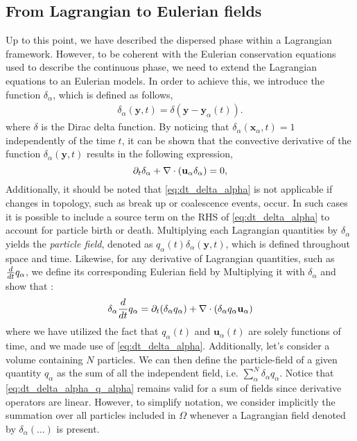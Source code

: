\subsection{From Lagrangian to Eulerian fields}
Up to this point, we have described the dispersed phase within a Lagrangian framework.
However, to be coherent with the Eulerian conservation equations used to describe the continuous phase, we need to extend the Lagrangian equations to an Eulerian models. 
In order to achieve this, we introduce the function $\delta_\alpha$, which is defined as follows, 
\begin{align}
    \delta_\alpha(\textbf{y},t) = \delta(\textbf{y}-\textbf{y}_\alpha(t)).
    \label{eq:delta_alpha}
\end{align}
where $\delta$ is the Dirac delta function.
By noticing that $\delta_\alpha(\textbf{x}_\alpha,t) = 1$ independently of the time $t$, it can be shown that the convective derivative of the function $\delta_\alpha(\textbf{y},t)$ results in the following expression, 
\begin{equation}
    \partial_t \delta_\alpha
    + \mathbf{\nabla} \cdot (\textbf{u}_\alpha  \delta_\alpha)
    =0,
    \label{eq:dt_delta_alpha}
\end{equation}
Additionally, it should be noted that \ref{eq:dt_delta_alpha} is not applicable if changes in topology, such as break up or coalescence events, occur.
In such cases it is possible to include a source term on the RHS of \ref{eq:dt_delta_alpha} to account for particle birth or death. 
Multiplying each Lagrangian quantities by $\delta_\alpha$ yields the \textit{particle field}, denoted as $q_\alpha(t)\delta_\alpha(\textbf{y},t)$, which is defined throughout space and time.
Likewise, for any derivative of Lagrangian quantities, such as $\frac{d}{d t} q_\alpha$, we define its corresponding Eulerian field by Multiplying it with $\delta_\alpha$ and show that :
\begin{equation}
    \delta_\alpha \frac{d}{d t} q_\alpha
    = \partial_t (\delta_\alpha q_\alpha)
    + \mathbf{\nabla} \cdot (\delta_\alpha q_\alpha \textbf{u}_\alpha)
    \label{eq:dt_delta_alpha_q_alpha}
\end{equation}
where we have utilized the fact that $q_\alpha(t)$ and $\textbf{u}_\alpha(t)$ are solely functions of time, and we made use of \ref{eq:dt_delta_alpha}.
Additionally, let's consider a volume containing $N$ particles.
We can then define the particle-field of a given quantity $q_\alpha$ as the sum of all the independent field, i.e. $\sum_\alpha^N \delta_\alpha q_\alpha$.
Notice that \ref{eq:dt_delta_alpha_q_alpha} remains valid for a sum of fields since derivative operators are linear.
However, to simplify notation, we consider implicitly the summation over all particles included in $\Omega$ whenever a Lagrangian field denoted by $\delta_\alpha (\ldots)$ is present.

